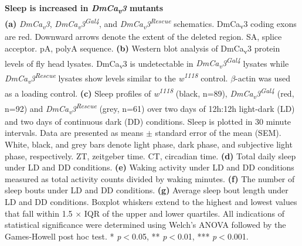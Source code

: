 \label{fig:3}
\textbf{Sleep is increased in \emph{DmCa\textsubscript{v}3} mutants}
\\
\textbf{(a)} \emph{DmCa\textsubscript{v}3}, \emph{DmCa\textsubscript{v}3\textsuperscript{Gal4}}, and \emph{DmCa\textsubscript{v}3\textsuperscript{Rescue}} schematics. 
DmCa\textsubscript{v}3 coding exons are red.
Downward arrows denote the extent of the deleted region.
SA, splice acceptor.
pA, polyA sequence.  
\textbf{(b)} Western blot analysis of DmCa\textsubscript{v}3 protein levels of fly head lysates.
DmCa\textsubscript{v}3 is undetectable in \emph{DmCa\textsubscript{v}3\textsuperscript{Gal4}} lysates while \emph{DmCa\textsubscript{v}3\textsuperscript{Rescue}} lysates show levels similar to the \emph{w\textsuperscript{1118}} control.
$\beta$-actin was used as a loading control.
\textbf{(c)} Sleep profiles of \emph{w\textsuperscript{1118}} (black, n=89), \emph{DmCa\textsubscript{v}3\textsuperscript{Gal4}} (red, n=92) and \emph{DmCa\textsubscript{v}3\textsuperscript{Rescue}}  (grey, n=61) over two days of 12h:12h light-dark (LD) and two days of continuous dark (DD) conditions.
Sleep is plotted in 30 minute intervals.
Data are presented as means $\pm$ standard error of the mean (SEM).
White, black, and grey bars denote light phase, dark phase, and subjective light phase, respectively.
ZT, zeitgeber time.
CT, circadian time.
\textbf{(d)} Total daily sleep under LD and DD conditions.
\textbf{(e)} Waking activity under LD and DD conditions measured as total activity counts divided by waking minutes.
\textbf{(f)} The number of sleep bouts under LD and DD conditions.
\textbf{(g)} Average sleep bout length under LD and DD conditions.
Boxplot whiskers extend to the highest and lowest values that fall within 1.5 $\times$ IQR of the upper and lower quartiles.
All indications of statistical significance were determined using Welch's ANOVA followed by the Games-Howell post hoc test.
* \emph{p}$<$0.05, ** \emph{p}$<$0.01, *** \emph{p}$<$0.001.
